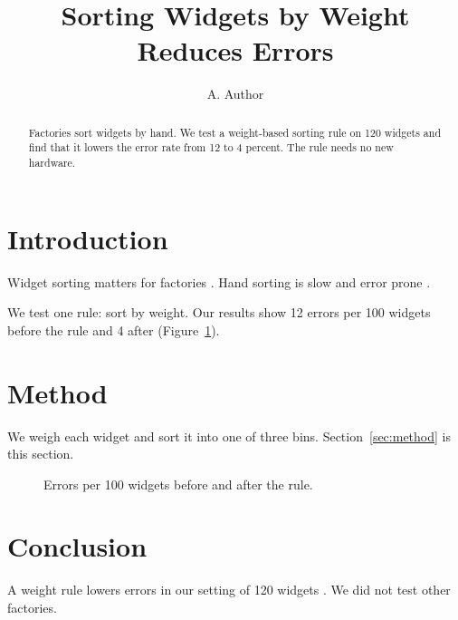 \documentclass{article}
\begin{document}
\title{Sorting Widgets by Weight Reduces Errors}
\author{A. Author}
\maketitle

\begin{abstract}
Factories sort widgets by hand. We test a weight-based sorting rule on 120 widgets and find that it lowers the error rate from 12 to 4 percent. The rule needs no new hardware.
\end{abstract}

\section{Introduction}
Widget sorting matters for factories \cite{smith2020}. Hand sorting is slow and error prone \cite{jones2021}.

We test one rule: sort by weight. Our results show 12 errors per 100 widgets before the rule and 4 after (Figure~\ref{fig:overview}).

\section{Method}
We weigh each widget and sort it into one of three bins. Section~\ref{sec:method} is this section.\label{sec:method}

\begin{figure}
\centering
\caption{Errors per 100 widgets before and after the rule.}
\label{fig:overview}
\end{figure}

\section{Conclusion}
A weight rule lowers errors in our setting of 120 widgets \cite{smith2020}. We did not test other factories.



\end{document}
